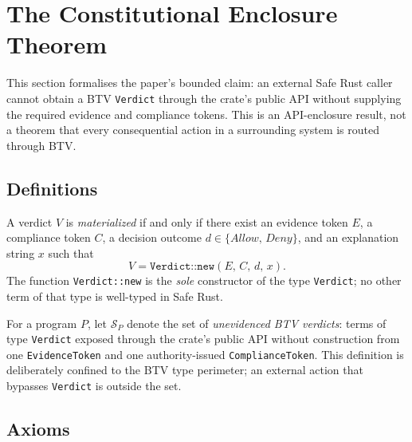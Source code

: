 
\section{The Constitutional Enclosure Theorem}
\label{sec:theorem}

This section formalises the paper's bounded claim: an external Safe Rust
caller cannot obtain a BTV \texttt{Verdict} through the crate's public API
without supplying the required evidence and compliance tokens.  This is an
API-enclosure result, not a theorem that every consequential action in a
surrounding system is routed through BTV.

\subsection{Definitions}
\label{sec:definitions}

\begin{definition}
\label{def:materialized}
A verdict $V$ is \emph{materialized} if and only if there exist an
evidence token $E$, a compliance token $C$, a decision outcome
$d \in \{\mathit{Allow},\, \mathit{Deny}\}$, and an explanation string
$x$ such that
\[
  V = \texttt{Verdict::new}(E,\, C,\, d,\, x).
\]
The function \texttt{Verdict::new} is the \emph{sole} constructor of
the type \texttt{Verdict}; no other term of that type is well-typed in
Safe Rust.
\end{definition}

\begin{definition}
\label{def:silent}
For a program $P$, let $\mathcal{S}_{P}$ denote the set of
\emph{unevidenced BTV verdicts}: terms of type \texttt{Verdict} exposed
through the crate's public API without construction from one
\texttt{EvidenceToken} and one authority-issued \texttt{ComplianceToken}.
This definition is deliberately confined to the BTV type perimeter; an
external action that bypasses \texttt{Verdict} is outside the set.
\end{definition}

\subsection{Axioms}
\label{sec:axioms}

